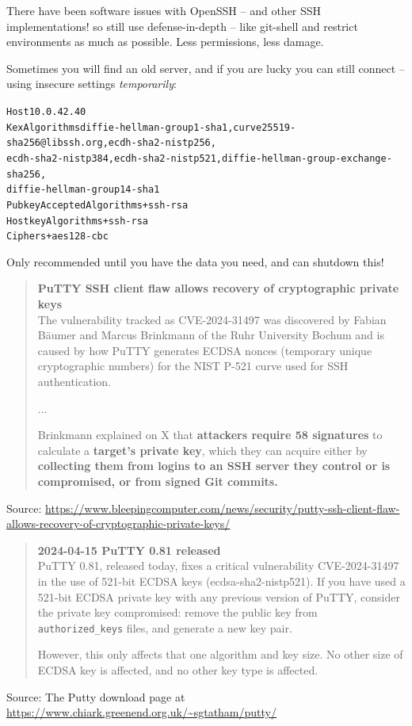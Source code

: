 \documentclass[Screen16to9,17pt]{foils}
\begin{document}
There have been software issues with OpenSSH -- and other SSH implementations! so still use defense-in-depth -- like git-shell and restrict environments as much as possible. Less permissions, less damage.



Sometimes you will find an old server, and if you are lucky you can still connect --using insecure settings \emph{temporarily}:
\begin{alltt}\scriptsize
Host 10.0.42.40
    KexAlgorithms diffie-hellman-group1-sha1,curve25519-sha256@libssh.org,ecdh-sha2-nistp256,
    ecdh-sha2-nistp384,ecdh-sha2-nistp521,diffie-hellman-group-exchange-sha256,
    diffie-hellman-group14-sha1
    PubkeyAcceptedAlgorithms +ssh-rsa
    HostkeyAlgorithms +ssh-rsa
    Ciphers +aes128-cbc
\end{alltt}

Only recommended until you have the data you need, and can shutdown this!


\begin{quote}{\bf \large
PuTTY SSH client flaw allows recovery of cryptographic private keys}\\
The vulnerability tracked as CVE-2024-31497 was discovered by Fabian Bäumer and Marcus Brinkmann of the Ruhr University Bochum and is caused by how PuTTY generates ECDSA nonces (temporary unique cryptographic numbers) for the NIST P-521 curve used for SSH authentication.

...

Brinkmann explained on X that {\bf attackers require 58 signatures} to calculate a {\bf target's private key}, which they can acquire either by {\bf collecting them from logins to an SSH server they control or is compromised, or from signed Git commits.}
\end{quote}

Source: {\footnotesize\url{https://www.bleepingcomputer.com/news/security/putty-ssh-client-flaw-allows-recovery-of-cryptographic-private-keys/}}


\begin{quote}\footnotesize{\bf
2024-04-15 PuTTY 0.81 released}\\

PuTTY 0.81, released today, fixes a critical vulnerability CVE-2024-31497 in the use of 521-bit ECDSA keys (ecdsa-sha2-nistp521). If you have used a 521-bit ECDSA private key with any previous version of PuTTY, consider the private key compromised: remove the public key from \verb+authorized_keys+ files, and generate a new key pair.

However, this only affects that one algorithm and key size. No other size of ECDSA key is affected, and no other key type is affected.
\end{quote}
Source: The Putty download page at
\url{https://www.chiark.greenend.org.uk/~sgtatham/putty/}
\end{document}
